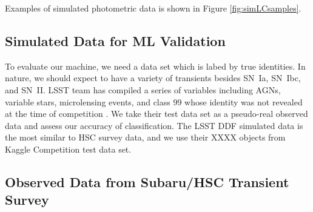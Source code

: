 \documentclass[useamsfonts]{pasj01}
\begin{document}
Examples of simulated photometric data is shown in Figure \ref{fig:simLCsamples}.

\subsection{Simulated Data for ML Validation}
\label{sec:validation}
To evaluate our machine, we need a data set which is labed by true identities.   In nature, we should expect to have a variety of transients besides SN~Ia, SN~Ibc, and SN~II.
LSST team has compiled a series of variables including AGNs, variable stars, microlensing events,
and class 99 whose identity was not revealed at the time of competition \citep{malz19a,kessler19a}.   
We take their test data set as a pseudo-real observed data and assess our accuracy of classification.
The LSST DDF simulated data is the most similar to HSC survey data, and we use their XXXX objects 
from Kaggle Competition \citep{malz19a} test data set.

\subsection{Observed Data from Subaru/HSC Transient Survey}
\label{sec:hscdata}

%
%
%
\end{document}
